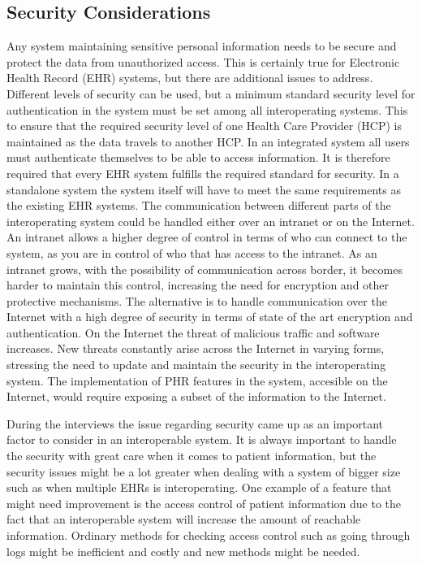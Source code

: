 \documentclass[14pt]{article}
\begin{document}
\subsection{Security Considerations}
\label{sec:resultsSecurity}
Any system maintaining sensitive personal information needs to be secure and protect the data from unauthorized access. This is certainly true for Electronic Health Record (EHR) systems, but there are additional issues to address. Different levels of security can be used, but a minimum standard security level for authentication in the system must be set among all interoperating systems. This to ensure that the required security level of one Health Care Provider (HCP) is maintained as the data travels to another \gls{HCP}. In an integrated system all users must authenticate themselves to be able to access information. It is therefore required that every \gls{EHR} system fulfills the required standard for security. In a standalone system the system itself will have to meet the same requirements as the existing \gls{EHR} systems. The communication between different parts of the interoperating system could be handled either over an intranet or on the Internet. An intranet allows a higher degree of control in terms of who can connect to the system, as you are in control of who that has access to the intranet. As an intranet grows, with the possibility of communication across border, it becomes harder to maintain this control, increasing the need for encryption and other protective mechanisms. The alternative is to handle communication over the Internet with a high degree of security in terms of state of the art encryption and authentication. On the Internet the threat of malicious traffic and software increases. New threats constantly arise across the Internet in varying forms, stressing the need to update and maintain the security in the interoperating system.
The implementation of \gls{PHR} features in the system, accesible on the Internet, would require exposing a subset of the information to the Internet.

During the interviews the issue regarding security came up as an important factor to consider in an interoperable system. It is always important to handle the security with great care when it comes to patient information, but the security issues might be a lot greater when dealing with a system of bigger size such as when multiple \glspl{EHR} is interoperating. One example of a feature that might need improvement is the access control of patient information due to the fact that an interoperable system will increase the amount of reachable information. Ordinary methods for checking access control such as going through logs might be inefficient and costly and new methods might be needed.
\end{document}
